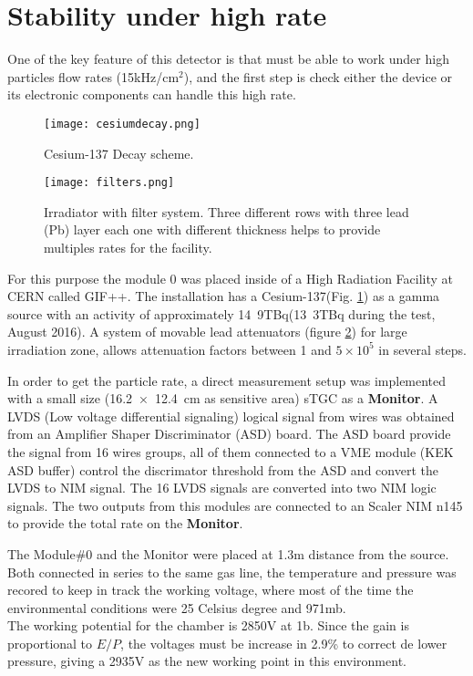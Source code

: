 \section{Stability under high rate}

One of the key feature of this detector is that must be able to work under high particles flow
rates (\unit{15}{kHz/cm$^2$}), and the first step is
check either the device or its electronic components can handle this high rate.\par
\begin{figure}[ht]
	\hspace*{\fill}
	\texttt{[image: cesiumdecay.png]}
	\hspace*{\fill}
	\caption{Cesium-137 Decay scheme.}\label{cesium}
\end{figure}
\begin{figure}[ht]
	\hspace*{\fill}
	\texttt{[image: filters.png]}
	\hspace*{\fill}
	\caption{Irradiator with filter system. Three different rows with
		three lead (Pb) layer each one with different thickness helps to provide multiples rates for the facility.}\label{filters}
\end{figure}
For this purpose the module 0 was
	placed inside of a High Radiation Facility at CERN called GIF++\cite{gif}.
	The installation has a Cesium-137(Fig. \ref{cesium}) as a gamma source with an activity of approximately
	\unit{14.9}{TBq}(\unit{13.3}{TBq} during the test, August 2016). 
	A system of movable lead attenuators (figure \ref{filters}) for large irradiation zone, allows attenuation factors
	between 1 and $5\times10^5$
	in several steps.\par 
	In order to get the particle rate, a direct measurement setup was implemented with a  small size (\SI{16,2x12,4}{cm} as
	sensitive area) sTGC as a {\bf Monitor}. A LVDS (Low voltage differential signaling) logical signal from wires was obtained from an
	Amplifier Shaper Discriminator (ASD) board\cite{asdchip}. The ASD board provide the signal from 16 wires groups, all
	of them connected to a VME module (KEK ASD buffer) control the discrimator threshold from the ASD and convert the LVDS to NIM signal. The 16 LVDS signals are converted into
	two NIM logic signals. The two outputs from this modules are connected to an Scaler NIM n145 to provide the total rate
	on the {\bf Monitor}.\par

	The Module\#0 and the Monitor were placed at 1.3m distance from the source. Both connected in series to the same
	gas line, the temperature and pressure was recored to keep in track the working voltage, where most of the time the
	environmental conditions were 25 Celsius degree and \unit{971}{mb}.\\
	The working potential for the chamber is 2850V at \unit{1}{b}. Since the gain is proportional to $E/P$, the voltages
	must be increase in 2.9\% to correct de lower pressure, giving a 2935V as the new working point in this environment. 

